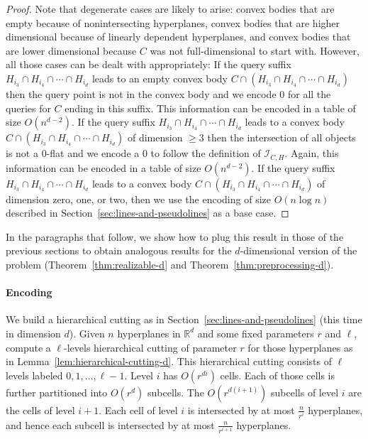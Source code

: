\begin{proof}
  Note that degenerate cases are likely to arise:
  convex bodies that are empty because of nonintersecting hyperplanes, convex
  bodies that are higher dimensional because of linearly dependent hyperplanes,
  and convex bodies that are lower dimensional because \(C\) was not
  full-dimensional to start with.
  However, all those cases can be dealt with appropriately:
  If the query suffix
  \(H_{i_3} \cap H_{i_4} \cap \cdots \cap H_{i_d}\)
  leads to an empty convex body
  \(C \cap (H_{i_3} \cap H_{i_4} \cap \cdots \cap H_{i_d})\)
  then the query point is not in the convex body and we encode
  \(0\) for all the queries for \(C\) ending in this suffix.
  This information can be encoded in a table of size \(O(n^{d-2})\).
  If the query suffix
  \(H_{i_3} \cap H_{i_4} \cap \cdots \cap H_{i_d}\)
  leads to a convex body
  \(C \cap (H_{i_3} \cap H_{i_4} \cap \cdots \cap H_{i_d})\)
  of dimension \(\geq 3\) then the intersection of all objects
  is not a \(0\)-flat and we encode a \(0\) to follow the definition
  of \(\mathcal{I}_{C,H}\).
  Again, this information can be encoded in a table of size \(O(n^{d-2})\).
  If the query suffix
  \(H_{i_3} \cap H_{i_4} \cap \cdots \cap H_{i_d}\)
  leads to a convex body
  \(C \cap (H_{i_3} \cap H_{i_4} \cap \cdots \cap H_{i_d})\)
  of dimension zero, one, or two,
  then we use the encoding of size \(O(n \log n)\) described in
  Section~\ref{sec:lines-and-pseudolines} as a base case.
\end{proof}


In the paragraphs that follow, we show how to plug this result in those of
the previous sections to obtain analogous results for the \(d\)-dimensional
version of the problem (Theorem~\ref{thm:realizable-d} and
Theorem~\ref{thm:preprocessing-d}).

\paragraph*{Encoding}
We build a hierarchical cutting as in
Section~\ref{sec:lines-and-pseudolines} (this time in dimension
\(d\)).
%
Given \(n\) hyperplanes in \(\mathbb{R}^d\) and some fixed
parameters \(r\) and \(\ell\), compute a \(\ell\)-levels hierarchical cutting
of parameter \(r\) for those
hyperplanes as in Lemma~\ref{lem:hierarchical-cutting-d}.
This hierarchical cutting consists of \( \ell \) levels
labeled \(0,1,\ldots,\ell-1\). Level \(i\) has \(O(r^{di})\)
cells. Each of those cells is further partitioned into
\(O(r^d)\) subcells. The \(O(r^{d(i+1)})\) subcells of level \(i\)
are the cells of level \(i+1\). Each cell of level \(i\) is intersected by at
most \(\frac{n}{r^i}\) hyperplanes, and hence each subcell is intersected by at
most \(\frac{n}{r^{i+1}}\) hyperplanes.

